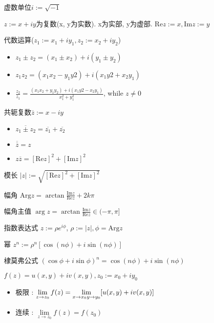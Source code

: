 \documentclass[UTF8, 12pt]{ctexart}
\begin{document}
	
	虚数单位$ i := \sqrt{-1} $

	$ z := x + iy $为复数(x, y为实数). x为实部, y为虚部. $ \mathrm{Re}z := x, \mathrm{Im}z := y $

	代数运算($ z_{1} := x_{1}+iy_{1}, z_{2} := x_{2}+iy_{2} $)
	\begin{itemize}[leftmargin = 4em]
		\item $ z_{1} \pm z_{2} = (x_{1} \pm x_{2}) + i(y_{1} \pm y_{2}) $
		\item $ z_{1}z_{2} = (x_{1}x_{2}-y_{1}y{2}) + i(x_{1}y{2}+x_{2}y_{1}) $
		\item $ \frac{z_{2}}{z_{1}} = \frac{(x_{1}x_{2}+y_{1}y_{2})+i(x_{1}y{2}-x_{2}y_{1})}{x_{1}^{2}+y_{1}^{2}} $, while $ z \ne 0 $
	\end{itemize}

	共轭复数$ \overline{z} := x - iy $
	\begin{itemize}[leftmargin = 4em]
		\item $ \overline{z_{1} \pm z_{2}} = \overline{z_{1}} + \overline{z_{2}} $
		\item $ \overline{\overline{z}} = z $
		\item $ z\overline{z} = [\mathrm{Re}z]^{2} + [\mathrm{Im}z]^{2} $
	\end{itemize}

	模长 $ |z| := \sqrt{[\mathrm{Re}z]^{2} + [\mathrm{Im}z]^{2}} $

	幅角 $ \mathrm{Arg}z = \arctan\frac{\mathrm{Im}z}{\mathrm{Re}z} + 2k\pi $

	幅角主值 $ \arg z = \arctan\frac{\mathrm{Im}z}{\mathrm{Re}z} \in (-\pi, \pi] $

	指数表达式 $ z := \rho e^{i\phi} $, $ \rho := |z|, \phi = \mathrm{Arg}z$

	幂 $ z^{n} := \rho^{n}[\cos(n\phi) + i\sin(n\phi)] $

	棣莫弗公式 $ (\cos\phi + i\sin\phi)^{n} = \cos(n\phi) + i\sin(n\phi) $

	$ f(z) = u(x, y) + iv(x, y) , z_{0} := x_{0} + iy_{0} $
	\begin{itemize}[leftmargin = 4em]
		\item 极限 : $ \lim\limits_{z \to z_{0}}f(z) =  \lim\limits_{x \to x_{0} \\ y \to y_{0}}[u(x, y) + iv(x, y)] $
		\item 连续 : $ \lim\limits_{z \to z_{0}}f(z) = f(z_{0}) $
	\end{itemize}
\end{document}
